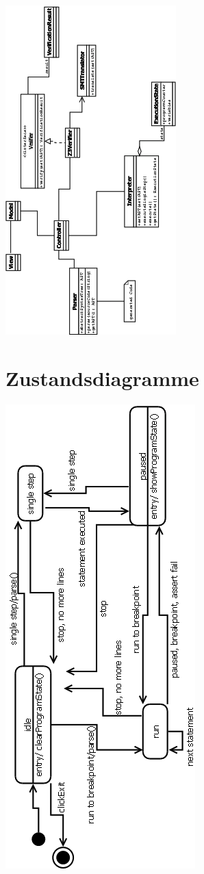 \documentclass[10pt,a4paper,titlepage]{article}
\begin{document}
\newpage
\includegraphics[scale=1.1]{ClassDiagram_alternative}
\newpage
\section{Zustandsdiagramme}
\newpage
\includegraphics[scale=0.75]{Zustandsdiagramm}
\newpage
\end{document}
